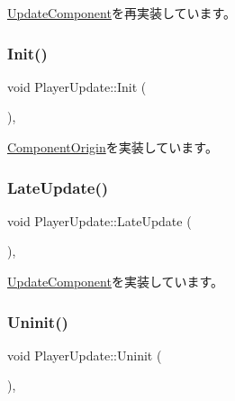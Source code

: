 \mbox{\hyperlink{class_update_component_a636b21061765a1101600c3ad70fadeac}{Update\+Component}}を再実装しています。

\mbox{\label{class_player_update_ac72b39db7b7bfaf094bde9ed1adef4b7}} 
\subsubsection{\texorpdfstring{Init()}{Init()}}
{\footnotesize\ttfamily void Player\+Update\+::\+Init (\begin{DoxyParamCaption}{ }\end{DoxyParamCaption})\hspace{0.3cm}{\ttfamily [override]}, {\ttfamily [virtual]}}



\mbox{\hyperlink{class_component_origin_a9f674891257f2272b1636d8b6bb05d81}{Component\+Origin}}を実装しています。

\mbox{\label{class_player_update_ae376f517f3458edfef61ac366aa78e36}} 
\subsubsection{\texorpdfstring{Late\+Update()}{LateUpdate()}}
{\footnotesize\ttfamily void Player\+Update\+::\+Late\+Update (\begin{DoxyParamCaption}{ }\end{DoxyParamCaption})\hspace{0.3cm}{\ttfamily [override]}, {\ttfamily [virtual]}}



\mbox{\hyperlink{class_update_component_aecc61593be4d1feff2db4d9ff1f83f9f}{Update\+Component}}を実装しています。

\mbox{\label{class_player_update_a997e0813a825d7525da4b5b89a290168}} 
\subsubsection{\texorpdfstring{Uninit()}{Uninit()}}
{\footnotesize\ttfamily void Player\+Update\+::\+Uninit (\begin{DoxyParamCaption}{ }\end{DoxyParamCaption})\hspace{0.3cm}{\ttfamily [override]}, {\ttfamily [virtual]}}



